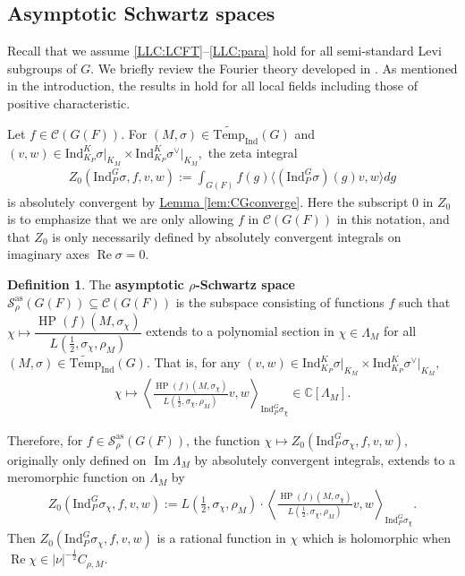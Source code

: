 \documentclass[10pt]{amsart}
\theoremstyle{definition}
\newtheorem{definition}[theorem]{Definition}
\numberwithin{equation}{section}
\numberwithin{equation}{subsection}
\newcommand{\Ind}{\mathrm{Ind}}
\newcommand{\CC}{\mathbb{C}}
\newcommand{\Temp}{\mathrm{Temp}}
\renewcommand{\Im}{\mathop{\mathrm{Im}}}
\renewcommand{\Re}{\mathop{\mathrm{Re}}}
\newcommand{\HP}{\mathop{\mathrm{HP}}\nolimits}
\begin{document}
\subsection{Asymptotic Schwartz spaces}\label{ssec:ass}  Recall that we assume \eqref{LLC:LCFT}--\eqref{LLC:para} hold for all semi-standard Levi subgroups of $G$. We briefly review the Fourier theory developed in \cite[\S4 and \S5]{DRS}. As mentioned in the introduction, the results   in \cite{DRS} hold for all local fields including those of positive characteristic. 


Let $f\in \mathcal{C}(G(F)).$ For $(M,\sigma)\in\widetilde{\Temp}_\Ind(G)$ and $(v,w)\in \Ind_{K_P}^K\sigma\vert_{K_M}\times \Ind_{K_P}^K\sigma^\vee\vert_{K_M},$ the zeta integral
\begin{align*}
     Z_0(\Ind_P^G\sigma,f,v,w):=\int_{G(F)} f(g)\langle (\Ind_P^G\sigma)(g)v,w \rangle dg
\end{align*}
is absolutely convergent by \hyperref[lem:CGconverge]{Lemma \ref{lem:CGconverge}}. Here the subscript $0$ in $Z_0$ is to emphasize that we are only allowing $f$ in $\mathcal{C}(G(F))$ in this notation, and that $Z_0$ is only necessarily defined by absolutely convergent integrals on imaginary axes $\Re \sigma=0$.


\begin{definition}  The \textbf{asymptotic $\rho$-Schwartz space} $\mathcal{S}_\rho^{\mathrm{as}}(G(F))\subseteq \mathcal{C}(G(F))$ is the subspace consisting of functions $f$ such that $\chi\mapsto \dfrac{\HP(f)(M,\sigma_\chi)}{L(\tfrac{1}{2},\sigma_\chi,\rho_M)}$ extends to a polynomial section in $\chi\in\Lambda_M$ for all $(M,\sigma)\in\widetilde{\Temp}_\Ind(G)$. That is, for any $(v,w)\in \Ind_{K_P}^K\sigma\vert_{K_M}\times \Ind_{K_P}^K\sigma^\vee\vert_{K_M},$
\begin{align*}
    \chi\mapsto \left\langle\frac{\HP(f)(M,\sigma_\chi)}{L(\tfrac{1}{2},\sigma_\chi,\rho_M)}v,w\right\rangle_{\Ind_P^G\sigma_\chi}\in \CC[\Lambda_M].
\end{align*}
\end{definition}

Therefore, for $f\in \mathcal{S}_\rho^{\mathrm{as}}(G(F))$, the function $\chi\mapsto Z_0(\Ind_P^G\sigma_\chi,f,v,w),$ originally only defined on $\Im\Lambda_{M}$ by absolutely convergent integrals, extends to a meromorphic function on $\Lambda_M$ by
\begin{align*}
    Z_0(\Ind_P^G\sigma_\chi,f,v,w) := L(\tfrac{1}{2},\sigma_\chi,\rho_M)\cdot\left\langle\frac{\HP(f)(M,\sigma_\chi)}{L(\tfrac{1}{2},\sigma_\chi,\rho_M)}v,w\right\rangle_{\Ind_P^G\sigma_\chi}.
\end{align*}
Then $Z_0(\Ind_P^G\sigma_\chi,f,v,w)$ is a rational function in $\chi$ which is holomorphic when $\Re\chi\in |\nu|^{-\frac{1}{2}}C_{\rho,M}$.
\end{document}
